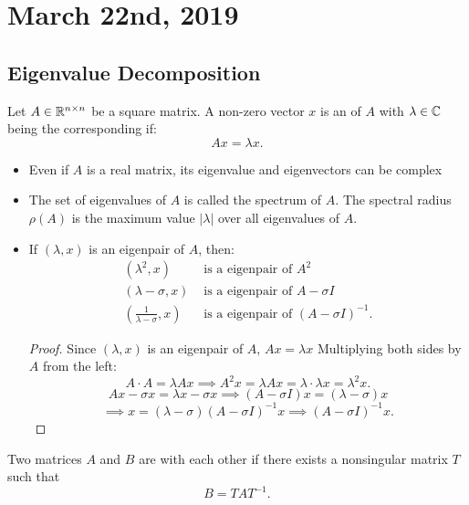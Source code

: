 \documentclass[../main/main.tex]{subfiles}
\begin{document}
\section{March 22nd, 2019}
\subsection{Eigenvalue Decomposition}

\begin{definition}
	Let $A \in \mathbb{R}^{n\times n}$ be a square matrix. A non-zero vector $x$ is an  of $A$ with  $\lambda\in \mathbb{C}$ being the corresponding  if: \[
		Ax=\lambda x		.\]  	
\end{definition}
\begin{itemize}
		\itemsep0.3cm
				\item Even if $A$ is a real matrix, its eigenvalue and eigenvectors can be complex
				\item The set of eigenvalues of $A$ is called the spectrum of $A$. The spectral radius $\rho\left( A \right) $ is the maximum value $\left| \lambda \right| $ over all eigenvalues of $A$.
				\item If $\left(\lambda,x \right) $ is an eigenpair of $A$, then:
						\begin{align*}
								\left( \lambda^2,x \right) &\textrm{ is a eigenpair of }A^2\\
								\left( \lambda-\sigma,x \right) &\textrm{ is a eigenpair of }A-\sigma I\\
								\left( \frac{1}{\lambda-\sigma},x \right) &\textrm{ is a eigenpair of }\left( A-\sigma I \right) ^{-1}
						.\end{align*}
\begin{proof}
							Since $\left( \lambda,x \right) $ is an eigenpair of $A$, $Ax=\lambda x$ Multiplying both sides by $A$ from the left:\[
				A\cdot A=\lambda A x \implies A^2x=\lambda Ax=\lambda\cdot\lambda x=\lambda^2 x
				.\] 
				\[
						Ax-\sigma x=\lambda x-\sigma x \implies \left( A-\sigma I \right) x=\left( \lambda-\sigma\right)x\]\[\implies x=\left( \lambda-\sigma \right) \left( A-\sigma I \right) ^{-1}x\implies\left( A-\sigma I \right) ^{-1}x
				.\]		
\end{proof}
\end{itemize}
\begin{definition}
	Two matrices $A$ and $B$ are  with each other if there exists a nonsingular matrix $T$ such that \[
		B=TAT^{-1}
		.\]  
\end{definition}
\end{document}
